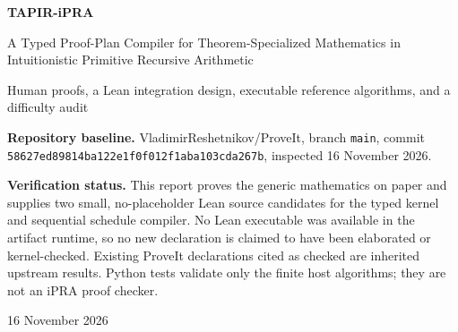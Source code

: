 \documentclass[11pt,oneside]{article}
\newcommand{\code}[1]{\nolinkurl{#1}}
\begin{document}
\begin{titlepage}
\centering
\vspace*{1.2cm}
{\Huge\bfseries\color{tapirblue} TAPIR-iPRA\par}
\vspace{0.35cm}
{\LARGE A Typed Proof-Plan Compiler for Theorem-Specialized Mathematics in Intuitionistic Primitive Recursive Arithmetic\par}
\vspace{0.9cm}
{\large Human proofs, a Lean integration design, executable reference algorithms, and a difficulty audit\par}
\vfill
\begin{minipage}{0.88\textwidth}
\colorbox{tapirgray}{\parbox{0.94\textwidth}{
\textbf{Repository baseline.} VladimirReshetnikov/ProveIt, branch \code{main}, commit
\code{58627ed89814ba122e1f0f012f1aba103cda267b}, inspected 16 November 2026.

\textbf{Verification status.} This report proves the generic mathematics on paper and supplies two
small, no-placeholder Lean source candidates for the typed kernel and sequential schedule compiler.
No Lean executable was available in the artifact runtime, so no new declaration is claimed to have
been elaborated or kernel-checked. Existing ProveIt declarations cited as checked are inherited
upstream results. Python tests validate only the finite host algorithms; they are not an iPRA proof
checker.
}}
\end{minipage}
\vfill
{\large 16 November 2026\par}
\end{titlepage}


\tableofcontents
\clearpage
{}













\appendix



\end{document}
